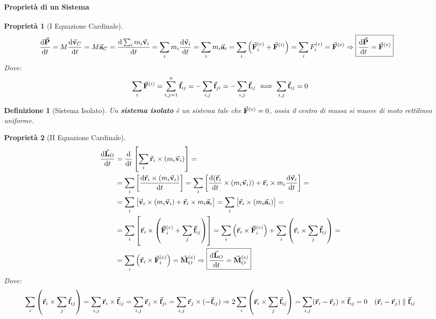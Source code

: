 \documentclass{article}
\newtheorem{property}{Proprietà}[section]
\newtheorem{defn}{Definizione}[section]
\newcommand{\then}{\ensuremath{\Rightarrow}}
\renewcommand{\a}{\va{a}}
\renewcommand{\v}{\va{v}}
\renewcommand{\r}{\va{r}}
\newcommand{\F}{\va{F}}
\newcommand{\f}{\va{f}}
\newcommand{\M}{\va{M}}
\renewcommand{\P}{\va{P}}
\renewcommand{\L}{\va{L}}
\begin{document}
\paragraph{Proprietà di un Sistema}
\begin{property}[I Equazione Cardinale]
\begin{equation}
\begin{split}
    \dv{\P}{t}=M\dv{\v_C}{t}&=M\a_C=\dv{\sum_im_i\v_i}{t}=\sum_im_i\dv{\v_i}{t}=\sum_im_i\a_i=\sum_i\left(\F_i^{(e)}+\F^{(i)}\right)=\sum_iF_i^{(e)}=\F^{(e)}\then \boxed{\dv{\P}{t}=\F^{(e)}}
\end{split}    
\end{equation}
Dove:
\[\sum_i\F^{(i)}=\sum_{i,j=1}^n\f_{ij}=-\sum_{i,j}\f_{ji}=-\sum_{i,j}\f_{ij}\iff \sum_{i,j}\f_{ij}=0\]
\end{property}
\begin{defn}[Sistema Isolato]
Un \textbf{sistema isolato} è un sistema tale che $\F^{(e)}=0$, ossia il centro di massa si muove di moto rettilineo uniforme.
\end{defn}
\begin{property}[II Equazione Cardinale]
\begin{equation}
\begin{split}
\dv{\L_O}{t}&=\dv{}{t}\left[\sum_i\r_i\times(m_i\v_i)\right]=\\
&=\sum_i\left[\dv{\r_i\times(m_i\v_i)}{t}\right]=\sum_i\left[\dv{(\r_i}{t}\times(m_i\v_i))+\r_i\times m_i\dv{\v_i}{t}\right]=\\
&=\sum_i\left[\v_i\times(m_i\v_i)+\r_i\times m_i\a_i\right]=\sum_i\left[\r_i\times(m_i\a_i)\right]=\\
&=\sum_i\left[\r_i\times\left(\F_i^{(e)}+\sum_j\f_{ij}\right)\right]=\sum_i\left(\r_i\times\F_i^{(e)}\right)+\sum_{i}\left(\r_i\times\sum_j\f_{ij}\right)=\\
&=\sum_i\left(\r_i\times\F_i^{(e)}\right)=\M_O^{(e)}\then \boxed{\dv{\L_O}{t}=\M_O^{(e)}}
\end{split}
\end{equation}
Dove:
\begin{equation}
    \sum_i\left(\r_i\times\sum_j\f_{ij}\right)=\sum_{i,j}\r_i\times\f_{ij}=\sum_{i,j}\r_j\times\f_{ji}=\sum_{i,j}\r_j\times(-\f_{ij})\then 2\sum_i\left(\r_i\times\sum_j\f_{ij}\right)=\sum_{i,j}(\r_i-\r_j)\times\f_{ij}=0\quad (\r_i-\r_j)\parallel\f_{ij}
\end{equation}
\end{property}
\end{document}
